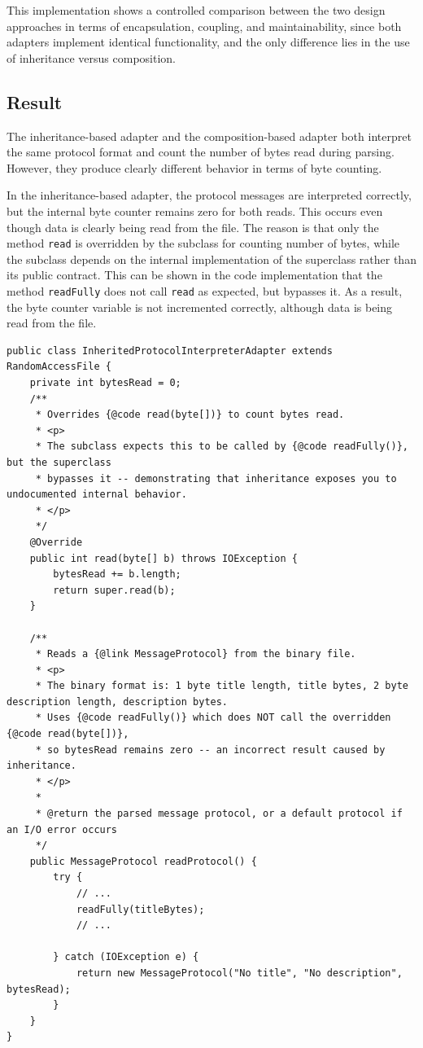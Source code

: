 \documentclass[a4paper]{scrartcl}
\begin{document}
This implementation shows a controlled comparison between the two design approaches in terms of encapsulation, coupling, and maintainability, since both adapters implement identical functionality, and the only difference lies in the use of inheritance versus composition.

\subsection{Result}

The inheritance-based adapter and the composition-based adapter both interpret the same protocol format and count the number of bytes read during parsing. However, they produce clearly different behavior in terms of byte counting.

In the inheritance-based adapter, the protocol messages are interpreted correctly, but the internal byte counter remains zero for both reads. This occurs even though data is clearly being read from the file. The reason is that only the method \texttt{read} is overridden by the subclass for counting number of bytes, while the subclass depends on the internal implementation of the superclass rather than its public contract. This can be shown in the code implementation that the method \texttt{readFully} does not call \texttt{read} as expected, but bypasses it. As a result, the byte counter variable is not incremented correctly, although data is being read from the file.

\begin{lstlisting}[style=javastyle, caption={Implementation of InheritedProtocolInterpreterAdapter}]
public class InheritedProtocolInterpreterAdapter extends RandomAccessFile {
    private int bytesRead = 0;
    /**
     * Overrides {@code read(byte[])} to count bytes read.
     * <p>
     * The subclass expects this to be called by {@code readFully()}, but the superclass
     * bypasses it -- demonstrating that inheritance exposes you to undocumented internal behavior.
     * </p>
     */
    @Override
    public int read(byte[] b) throws IOException {
        bytesRead += b.length;
        return super.read(b);
    }

    /**
     * Reads a {@link MessageProtocol} from the binary file.
     * <p>
     * The binary format is: 1 byte title length, title bytes, 2 byte description length, description bytes.
     * Uses {@code readFully()} which does NOT call the overridden {@code read(byte[])},
     * so bytesRead remains zero -- an incorrect result caused by inheritance.
     * </p>
     *
     * @return the parsed message protocol, or a default protocol if an I/O error occurs
     */
    public MessageProtocol readProtocol() {
        try {
            // ...
            readFully(titleBytes);
            // ...

        } catch (IOException e) {
            return new MessageProtocol("No title", "No description", bytesRead);
        }
    }
}
\end{lstlisting}
\end{document}
